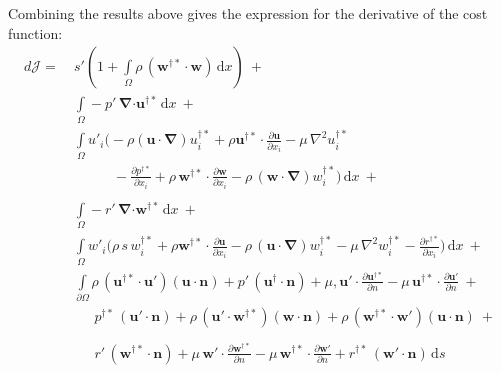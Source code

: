 \documentclass[12pt, a4paper]{article}
\begin{document}
Combining the results above gives the expression for the derivative of the cost function:
\begin{equation}
\begin{split}
d \mathcal{J} = \ &
s' \left( 1 + 
\int\limits_{\Omega} \rho \, (\mathbf{w^{\dagger *} \cdot w}) 
\, \mathrm{d} x
\right) \ + \\
&\int\limits_{\Omega}
-p' \, \boldsymbol{\nabla} \mathbf{\cdot u^{\dagger *}}
\, \mathrm{d} x \ + \\
&\int\limits_{\Omega} u'_i \bigg( 
- \rho (\mathbf{u \cdot} \boldsymbol{\nabla}) u^{\dagger*}_i + 
\rho \mathbf{u^{\dagger*} \cdot} \frac{\partial \mathbf{u}}{\partial x_i} - 
\mu \, \nabla^2 u^{\dagger*}_i \\ 
& \phantom{\int\limits_{\Omega} u'_i \bigg( \ }
- \frac{\partial p^{\dagger*}}{\partial x_i} + 
\rho \, \mathbf{w^{\dagger*} \cdot} \frac{\partial \mathbf{w}}{\partial x_i} - 
\rho \, (\mathbf{w \cdot} \boldsymbol{\nabla}) w^{\dagger*}_i
\bigg) \, \mathrm{d} x \ + \\
&\int\limits_{\Omega}
-r' \, \boldsymbol{\nabla} \mathbf{\cdot w^{\dagger *}}
\, \mathrm{d} x \ + \\
&\int\limits_{\Omega} w'_i \bigg( 
\rho \, s \, w^{\dagger*}_i + 
\rho \mathbf{w^{\dagger*} \cdot} \frac{\partial \mathbf{u}}{\partial x_i} - 
\rho \, (\mathbf{u \cdot} \boldsymbol{\nabla}) w^{\dagger*}_i - 
\mu \, \nabla^2 w^{\dagger*}_i - 
\frac{\partial r^{\dagger*}}{\partial x_i}
\bigg) \, \mathrm{d} x \ + \\
&\int\limits_{\partial \Omega}
\rho \, (\mathbf{u^{\dagger*} \cdot u'}) (\mathbf{u \cdot n}) + 
p' \, (\mathbf{u^{\dagger} \cdot n}) + 
\mu, \mathbf{u' \cdot} \frac{\partial \mathbf{u^{\dagger*}}}{\partial n} - 
\mu \, \mathbf{u^{\dagger*} \cdot} \frac{\partial \mathbf{u'}}{\partial n} \ + \\
&\phantom{\int\limits_{\partial \Omega} \ }
p^{\dagger*} \, (\mathbf{u' \cdot n}) + 
\rho \, (\mathbf{u' \cdot w^{\dagger*}}) (\mathbf{w \cdot n}) + 
\rho \, (\mathbf{w^{\dagger*} \cdot w'}) (\mathbf{u \cdot n}) \ + \\
&\phantom{\int\limits_{\partial \Omega} \ }
r' \, (\mathbf{w^{\dagger*} \cdot n}) + 
\mu \, \mathbf{w' \cdot} \frac{\partial \mathbf{w^{\dagger*}}}{\partial n} - 
\mu \, \mathbf{w^{\dagger*} \cdot} \frac{\partial \mathbf{w'}}{\partial n} + 
r^{\dagger*} \, (\mathbf{w' \cdot n})
\, \mathrm{d} s
\end{split}
\end{equation}
\end{document}
